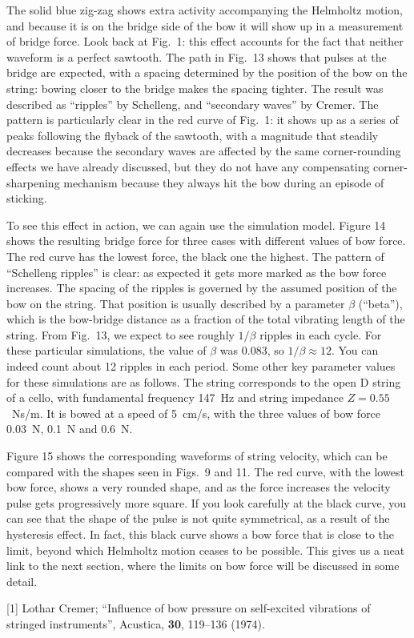   The solid blue zig-zag shows extra activity accompanying the Helmholtz 
  motion, and because it is on the bridge side of the bow it will show up in a 
  measurement of bridge force. Look back at Fig.\ 1: this effect accounts for 
  the fact that neither waveform is a perfect sawtooth. The path in Fig.\ 13 
  shows that pulses at the bridge are expected, with a spacing determined by 
  the position of the bow on the string: bowing closer to the bridge makes the 
  spacing tighter. The result was described as ``ripples'' by Schelleng, and 
  ``secondary waves'' by Cremer. The pattern is particularly clear in the red 
  curve of Fig.\ 1: it shows up as a series of peaks following the flyback of 
  the sawtooth, with a magnitude that steadily decreases because the secondary 
  waves are affected by the same corner-rounding effects we have already 
  discussed, but they do not have any compensating corner-sharpening mechanism 
  because they always hit the bow during an episode of sticking. 

  To see this effect in action, we can again use the simulation model. Figure 
  14 shows the resulting bridge force for three cases with different values of 
  bow force. The red curve has the lowest force, the black one the highest. The 
  pattern of ``Schelleng ripples'' is clear: as expected it gets more marked as 
  the bow force increases. The spacing of the ripples is governed by the 
  assumed position of the bow on the string. That position is usually described 
  by a parameter $\beta$ (``beta''), which is the bow-bridge distance as a 
  fraction of the total vibrating length of the string. From Fig.\ 13, we 
  expect to see roughly $1/\beta$ ripples in each cycle. For these particular 
  simulations, the value of $\beta$ was 0.083, so $1/\beta \approx 12$. You can 
  indeed count about 12 ripples in each period. Some other key parameter values 
  for these simulations are as follows. The string corresponds to the open D 
  string of a cello, with fundamental frequency 147 Hz and string impedance 
  $Z=0.55$ Ns/m. It is bowed at a speed of 5 cm/s, with the three values of bow 
  force 0.03 N, 0.1 N and 0.6 N. 

  Figure 15 shows the corresponding waveforms of string velocity, which can be 
  compared with the shapes seen in Figs.\ 9 and 11. The red curve, with the 
  lowest bow force, shows a very rounded shape, and as the force increases the 
  velocity pulse gets progressively more square. If you look carefully at the 
  black curve, you can see that the shape of the pulse is not quite 
  symmetrical, as a result of the hysteresis effect. In fact, this black curve 
  shows a bow force that is close to the limit, beyond which Helmholtz motion 
  ceases to be possible. This gives us a neat link to the next section, where 
  the limits on bow force will be discussed in some detail. 



  \sectionreferences{}[1] Lothar Cremer; ``Influence of bow pressure on 
  self-excited vibrations of stringed instruments'', Acustica, \textbf{30}, 
  119--136 (1974). 